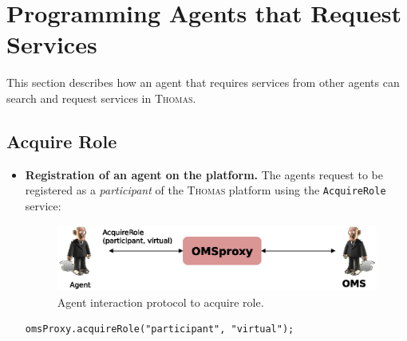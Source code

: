 \section{Programming Agents that Request Services}
This section describes how an agent that requires services from other agents can search and request services in \textsc{Thomas}.

\subsection{Acquire Role}
\begin{itemize}
\item \textbf{Registration of an agent on the platform.} The agents request to be registered as a \textit{participant} of the \textsc{Thomas} platform using the \lstinline|AcquireRole| service:
\begin{figure}[h!t]
	\centering
	\includegraphics[width=.8\textwidth]{Thomas/images/acquireRoleparticipant}
	\caption{Agent interaction protocol to acquire role.}
\end{figure}
\begin{lstlisting}
omsProxy.acquireRole("participant", "virtual");
\end{lstlisting}


\end{itemize}


